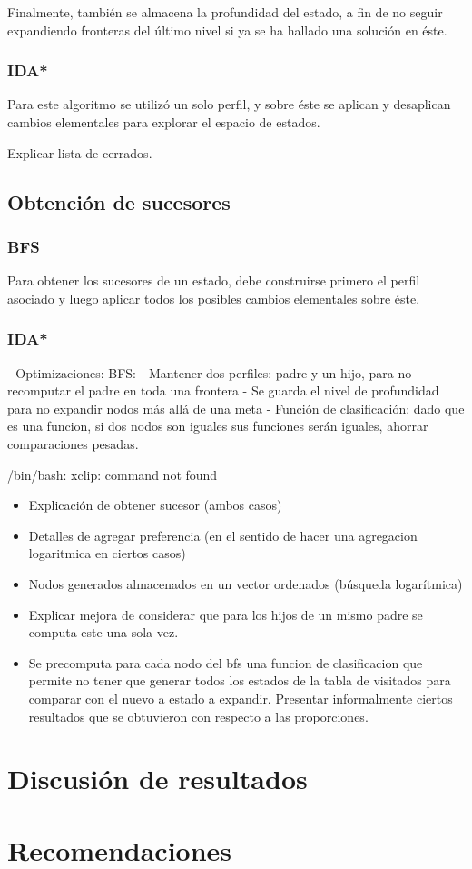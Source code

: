 \documentclass[letterpaper,12pt, titlepage]{article}
\begin{document}
    Finalmente, también se almacena la profundidad del estado, a fin de no seguir
    expandiendo fronteras del último nivel si ya se ha hallado una solución
    en éste.

\subsubsection*{IDA*}
    Para este algoritmo se utilizó un solo perfil, y sobre éste se aplican
    y desaplican cambios elementales para explorar el espacio de estados.

    Explicar lista de cerrados.

\subsection*{Obtención de sucesores}
\subsubsection*{BFS}
    Para obtener los sucesores de un estado, debe construirse primero
    el perfil asociado y luego aplicar todos los posibles cambios elementales
    sobre éste.

\subsubsection*{IDA*}

        - Optimizaciones:
            BFS:
                - Mantener dos perfiles: padre y un hijo, para no recomputar el padre en toda una frontera
                - Se guarda el nivel de profundidad para no expandir nodos más allá de una meta
                - Función de clasificación: dado que es una funcion, si dos nodos son iguales sus funciones serán iguales, ahorrar comparaciones pesadas.

/bin/bash: xclip: command not found

\begin{itemize}
\item Explicación de obtener sucesor (ambos casos)

\item Detalles de agregar preferencia (en el sentido
de hacer una agregacion logaritmica en ciertos casos)
\item Nodos generados almacenados en un vector ordenados
(búsqueda logarítmica)

\item Explicar mejora de considerar que para los hijos
de un mismo padre se computa este una sola vez.

\item Se precomputa para cada nodo del bfs una funcion de
clasificacion que permite no tener que generar todos los
estados de la tabla de visitados para comparar con el
nuevo a estado a expandir. Presentar informalmente
ciertos resultados que se obtuvieron con respecto a las
proporciones.

\end{itemize}

\section{Discusión de resultados}

\section{Recomendaciones}
\end{document}
